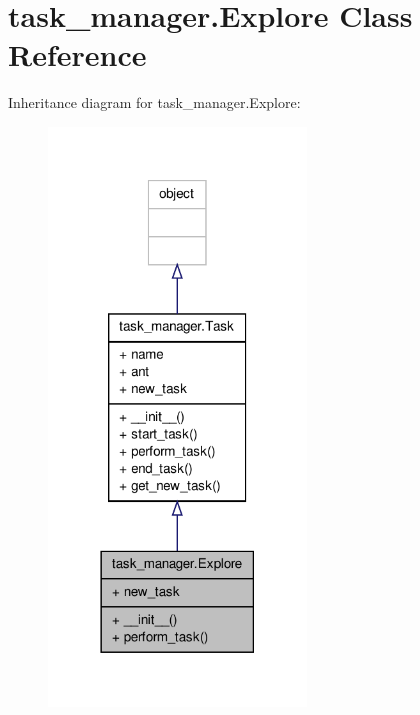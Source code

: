 \hypertarget{classtask__manager_1_1Explore}{\section{task\+\_\+manager.\+Explore Class Reference}
\label{classtask__manager_1_1Explore}
}


Inheritance diagram for task\+\_\+manager.\+Explore\+:\nopagebreak
\begin{figure}[H]
\begin{center}
\leavevmode
\includegraphics[width=194pt]{classtask__manager_1_1Explore__inherit__graph}
\end{center}
\end{figure}


